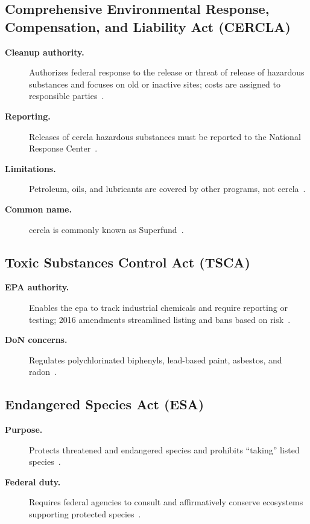 \documentclass[../main.tex]{subfiles}
\begin{document}
\subsection{Comprehensive Environmental Response, Compensation, and Liability Act (CERCLA)}
\begin{description}
  \item[\textbf{Cleanup authority.}] Authorizes federal response to the release or threat of release of hazardous substances and focuses on old or inactive sites; costs are assigned to responsible parties~\autocite{edo-3-3-7-environmental-requirements-2025}.
  \item[\textbf{Reporting.}] Releases of \ac{cercla} hazardous substances must be reported to the National Response Center~\autocite{edo-3-3-7-environmental-requirements-2025}.
  \item[\textbf{Limitations.}] Petroleum, oils, and lubricants are covered by other programs, not \ac{cercla}~\autocite{edo-3-3-7-environmental-requirements-2025}.
  \item[\textbf{Common name.}] \ac{cercla} is commonly known as Superfund~\autocite{edo-3-3-7-environmental-requirements-2025}.
\end{description}

\subsection{Toxic Substances Control Act (TSCA)}
\begin{description}
  \item[\textbf{EPA authority.}] Enables the \ac{epa} to track industrial chemicals and require reporting or testing; 2016 amendments streamlined listing and bans based on risk~\autocite{edo-3-3-7-environmental-requirements-2025}.
  \item[\textbf{DoN concerns.}] Regulates polychlorinated biphenyls, lead-based paint, asbestos, and radon~\autocite{edo-3-3-7-environmental-requirements-2025}.
\end{description}

\subsection{Endangered Species Act (ESA)}
\begin{description}
  \item[\textbf{Purpose.}] Protects threatened and endangered species and prohibits ``taking'' listed species~\autocite{edo-3-3-7-environmental-requirements-2025}.
  \item[\textbf{Federal duty.}] Requires federal agencies to consult and affirmatively conserve ecosystems supporting protected species~\autocite{edo-3-3-7-environmental-requirements-2025}.
\end{description}
\end{document}
